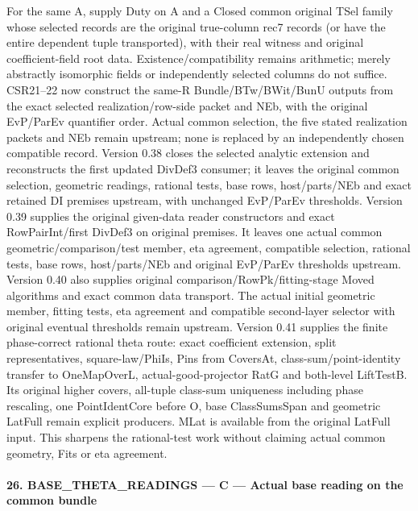 For the same A, supply Duty on A and a Closed common original TSel family whose selected records are the original true-column rec7 records (or have the entire dependent tuple transported), with their real witness and original coefficient-field root data. Existence/compatibility remains arithmetic; merely abstractly isomorphic fields or independently selected columns do not suffice. CSR21–22 now construct the same-R Bundle/BTw/BWit/BunU outputs from the exact selected realization/row-side packet and NEb, with the original EvP/ParEv quantifier order. Actual common selection, the five stated realization packets and NEb remain upstream; none is replaced by an independently chosen compatible record. Version 0.38 closes the selected analytic extension and reconstructs the first updated DivDef3 consumer; it leaves the original common selection, geometric readings, rational tests, base rows, host/parts/NEb and exact retained DI premises upstream, with unchanged EvP/ParEv thresholds. Version 0.39 supplies the original given-data reader constructors and exact RowPairInt/first DivDef3 on original premises. It leaves one actual common geometric/comparison/test member, eta agreement, compatible selection, rational tests, base rows, host/parts/NEb and original EvP/ParEv thresholds upstream. Version 0.40 also supplies original comparison/RowPk/fitting-stage Moved algorithms and exact common data transport. The actual initial geometric member, fitting tests, eta agreement and compatible second-layer selector with original eventual thresholds remain upstream. Version 0.41 supplies the finite phase-correct rational theta route: exact coefficient extension, split representatives, square-law/PhiIs, Pins from CoversAt, class-sum/point-identity transfer to OneMapOverL, actual-good-projector RatG and both-level LiftTestB. Its original higher covers, all-tuple class-sum uniqueness including phase rescaling, one PointIdentCore before O, base ClassSumsSpan and geometric LatFull remain explicit producers. MLat is available from the original LatFull input. This sharpens the rational-test work without claiming actual common geometry, Fits or eta agreement.



\paragraph{26. BASE\_\allowbreak THETA\_\allowbreak READINGS — C — Actual base reading on the common bundle}

